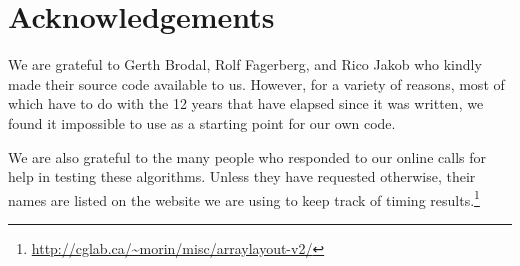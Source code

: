 \documentclass{patmorin}
\begin{document}
%
%
%

\section*{Acknowledgements}

We are grateful to  Gerth Brodal, Rolf Fagerberg, and Rico Jakob who
kindly made their source code available to us. However, for a variety
of reasons, most of which have to do with the 12 years that have elapsed
since it was written, we found it impossible to use as a starting point
for our own code.

We are also grateful to the many people who responded to
our online calls for help in testing these algorithms.
Unless they have requested otherwise, their names are
listed on the website we are using to keep track of timing
results.\footnote{\url{http://cglab.ca/~morin/misc/arraylayout-v2/}}




\end{document}

